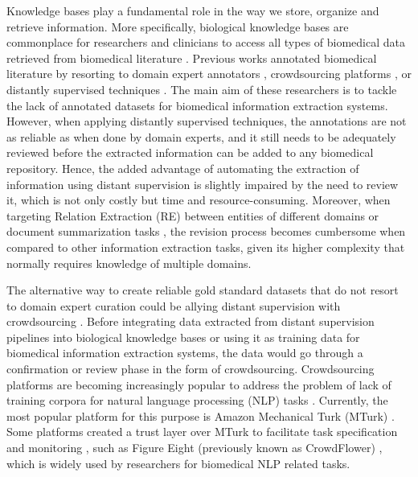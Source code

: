 Knowledge bases play a fundamental role in the way we store, organize and retrieve information. More specifically, biological knowledge bases are commonplace for researchers and clinicians to access all types of biomedical data retrieved from biomedical literature \citep{arnaboldi2020text}. Previous works annotated biomedical literature by resorting to domain expert annotators \citep{herrero2013ddi}, crowdsourcing platforms \citep{tsueng2020applying}, or distantly supervised techniques \citep{sousa2019silver}. The main aim of these researchers is to tackle the lack of annotated datasets for biomedical information extraction systems. However, when applying distantly supervised techniques, the annotations are not as reliable as when done by domain experts, and it still needs to be adequately reviewed before the extracted information can be added to any biomedical repository. Hence, the added advantage of automating the extraction of information using distant supervision is slightly impaired by the need to review it, which is not only costly but time and resource-consuming.  Moreover, when targeting Relation Extraction (RE) between entities of different domains or document summarization tasks \citep{narayan2018ranking}, the revision process becomes cumbersome when compared to other information extraction tasks, given its higher complexity that normally requires knowledge of multiple domains. 

The alternative way to create reliable gold standard datasets that do not resort to domain expert curation could be allying distant supervision with crowdsourcing \citep{gormley2010non,liu2016effective,collovini2018annotating}. Before integrating data extracted from distant supervision pipelines into biological knowledge bases or using it as training data for biomedical information extraction systems, the data would go through a confirmation or review phase in the form of crowdsourcing. Crowdsourcing platforms are becoming increasingly popular to address the problem of lack of training corpora for natural language processing (NLP) tasks \citep{callison2010creating}. Currently, the most popular platform for this purpose is Amazon Mechanical Turk (MTurk) \citep{ipeirotis2010quality,yetisgen2010preliminary,khare2015scaling}. Some platforms created a trust layer over MTurk to facilitate task specification and monitoring \citep{wang2013perspectives}, such as Figure Eight (previously known as CrowdFlower) \citep{li2016crowdsourcing,feyisetan2015towards}, which is widely used by researchers for biomedical NLP related tasks. 

